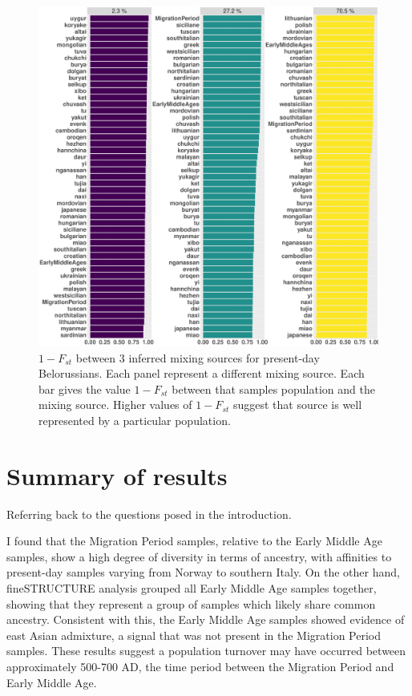 \begin{figure}[htp]
    \centering
    \includegraphics[width=1.0\textwidth]{../images/chapter5/Fst_plot_HB:belorussian.pdf}
    \caption{$1 - F_{st}$ between 3 inferred mixing sources for present-day Belorussians. Each panel represent a different mixing source. Each bar gives the value $1-F_{st}$ between that samples population and the mixing source. Higher values of $1-F_{st}$ suggest that source is well represented by a particular population. }
    \label{fig:Fst_plot_HB:lithuanian}
\end{figure} 

\section{Summary of results}

Referring back to the questions posed in the introduction.

I found that the Migration Period samples, relative to the Early Middle Age samples, show a high degree of diversity in terms of ancestry, with affinities to present-day samples varying from Norway to southern Italy. On the other hand, fineSTRUCTURE analysis grouped all Early Middle Age samples together, showing that they represent a group of samples which likely share common ancestry. Consistent with this, the Early Middle Age samples showed evidence of east Asian admixture, a signal that was not present in the Migration Period samples. These results suggest a population turnover may have occurred between approximately 500-700 AD, the time period between the Migration Period and Early Middle Age.

